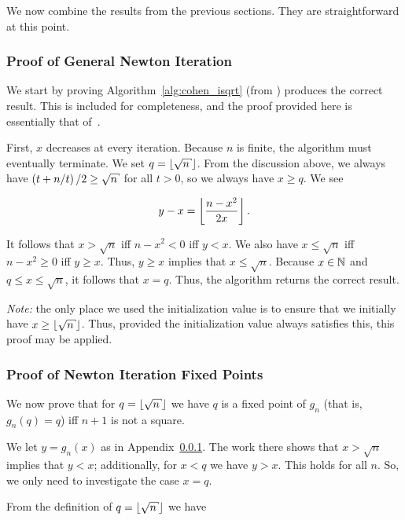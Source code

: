 We now combine the results from the previous sections.
They are straightforward at this point.

\subsubsection{Proof of General Newton Iteration}
\label{proof:general_newton}

We start by proving Algorithm~\ref{alg:cohen_isqrt}
(from \cite[Algorithm 1.7.1]{cohen1993})
produces the correct result.
This is included for completeness,
and the proof provided here is essentially that
of~\cite[Algorithm 1.7.1, Proof]{cohen1993}.

First, $x$ decreases at every iteration.
Because $n$ is finite, the algorithm must eventually terminate.
We set $q = \floor{\sqrt{n}}$.
From the discussion above, we always have $\parens{t + n/t}/2 \ge \sqrt{n}$
for all $t > 0$,
so we always have $x\ge q$.
We see

\begin{equation}
    y - x = \left\lfloor \frac{n - x^{2}}{2x} \right\rfloor.
\end{equation}

\noindent
It follows that $x > \sqrt{n}$ iff $n - x^{2} < 0$ iff $y < x$.
We also have $x \le \sqrt{n}$ iff $n - x^{2} \ge 0$ iff $y\ge x$.
Thus, $y\ge x$ implies that $x \le \sqrt{n}$.
Because $x\in\mathbb{N}$ and $q\le x \le \sqrt{n}$, it follows that $x = q$.
Thus, the algorithm returns the correct result.

\emph{Note:} the only place we used the initialization value
is to ensure that we initially have $x \ge \floor{\sqrt{n}}$.
Thus, provided the initialization value always satisfies this,
this proof may be applied.

\subsubsection{Proof of Newton Iteration Fixed Points}
\label{proof:newton_fixed_points}

We now prove that for $q = \floor{\sqrt{n}}$ we have
$q$ is a fixed point of $g_{n}$ (that is, $g_{n}(q) = q$)
iff $n+1$ is not a square.

We let $y = g_{n}(x)$ as in Appendix~\ref{proof:general_newton}.
The work there shows that $x>\sqrt{n}$ implies that $y<x$;
additionally, for $x<q$ we have $y>x$.
This holds for all $n$.
So, we only need to investigate the case $x = q$.

From the definition of $q = \floor{\sqrt{n}}$ we have

